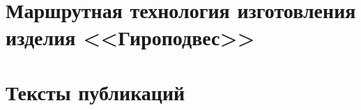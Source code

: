 \chapter{Маршрутная технология изготовления изделия <<Гироподвес>>}\label{app:A}

\clearpage



\chapter{Тексты публикаций}\label{app:B}

\clearpage













